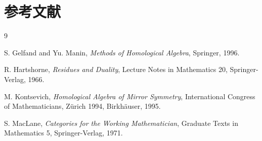 \section*{参考文献}

\begin{thebibliography}{9}

 S. Gelfand and Yu. Manin,
\textit{Methods of Homological Algebra}, Springer, 1996.

 R. Hartshorne,
\textit{Residues and Duality}, Lecture Notes in Mathematics 20,
Springer-Verlag, 1966.

 M. Kontsevich,
\textit{Homological Algebra of Mirror Symmetry}, International Congress of
Mathematicians, Z\"urich 1994, Birkh\"auser, 1995.

 S. MacLane, \textit{Categories for the Working
Mathematician}, Graduate Texts in Mathematics 5, Springer-Verlag, 1971.

\end{thebibliography}

\vspace{1em}
